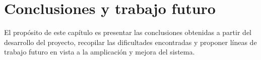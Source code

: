 \chapter{Conclusiones y trabajo futuro}
El propósito de este capítulo es presentar las conclusiones obtenidas a partir
del desarrollo del proyecto, recopilar las dificultades encontradas y proponer
líneas de trabajo futuro en vista a la amplicación y mejora del sistema.
